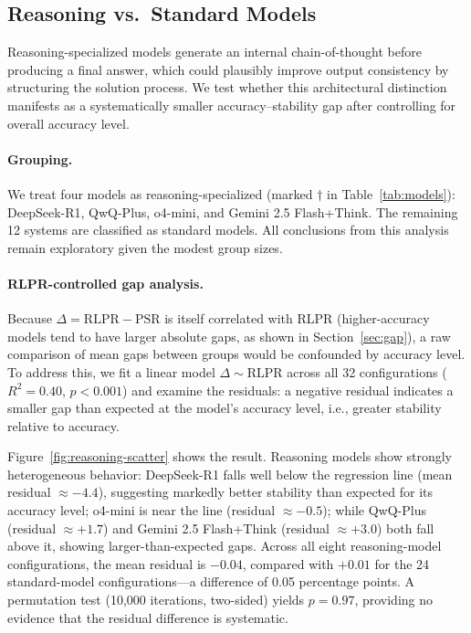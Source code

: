 \documentclass[11pt,a4paper]{article}
\begin{document}
\subsection{Reasoning vs.\ Standard Models}

Reasoning-specialized models generate an internal chain-of-thought before producing a final answer, which could plausibly improve output consistency by structuring the solution process. We test whether this architectural distinction manifests as a systematically smaller accuracy--stability gap after controlling for overall accuracy level.

\paragraph{Grouping.} We treat four models as reasoning-specialized (marked $\dagger$ in Table~\ref{tab:models}): DeepSeek-R1, QwQ-Plus, o4-mini, and Gemini 2.5 Flash+Think. The remaining 12 systems are classified as standard models. All conclusions from this analysis remain exploratory given the modest group sizes.

\paragraph{RLPR-controlled gap analysis.} Because $\Delta = \mathrm{RLPR} - \mathrm{PSR}$ is itself correlated with RLPR (higher-accuracy models tend to have larger absolute gaps, as shown in Section~\ref{sec:gap}), a raw comparison of mean gaps between groups would be confounded by accuracy level. To address this, we fit a linear model $\Delta \sim \mathrm{RLPR}$ across all 32 configurations ($R^2=0.40$, $p<0.001$) and examine the residuals: a negative residual indicates a smaller gap than expected at the model's accuracy level, i.e., greater stability relative to accuracy.

Figure~\ref{fig:reasoning-scatter} shows the result. Reasoning models show strongly heterogeneous behavior: DeepSeek-R1 falls well below the regression line (mean residual $\approx -4.4$), suggesting markedly better stability than expected for its accuracy level; o4-mini is near the line (residual $\approx -0.5$); while QwQ-Plus (residual $\approx +1.7$) and Gemini 2.5 Flash+Think (residual $\approx +3.0$) both fall above it, showing larger-than-expected gaps. Across all eight reasoning-model configurations, the mean residual is $-0.04$, compared with $+0.01$ for the 24 standard-model configurations---a difference of 0.05 percentage points. A permutation test (10{,}000 iterations, two-sided) yields $p=0.97$, providing no evidence that the residual difference is systematic.
\end{document}
